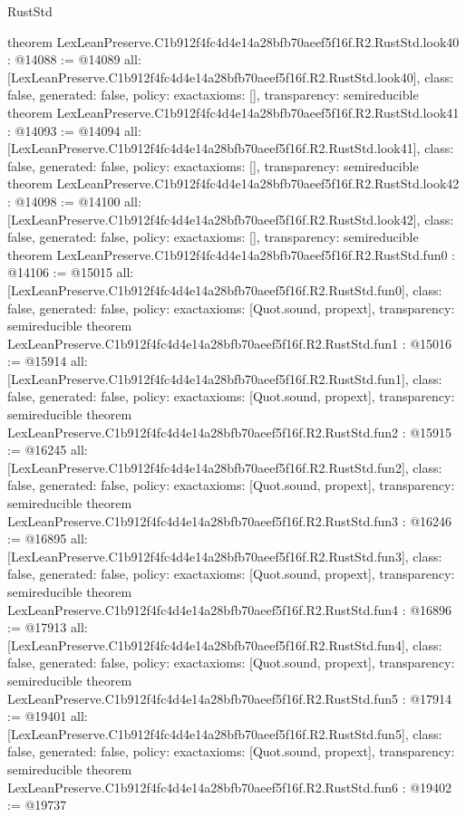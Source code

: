\begin{lexlean}{RustStd}
\begin{coremodule}
{}
theorem LexLeanPreserve.C1b912f4fc4d4e14a28bfb70aeef5f16f.R2.RustStd.look40 : @14088 := @14089 {
  all: [LexLeanPreserve.C1b912f4fc4d4e14a28bfb70aeef5f16f.R2.RustStd.look40],
  class: false,
  generated: false,
  policy: exact{axioms: []},
  transparency: semireducible
}
theorem LexLeanPreserve.C1b912f4fc4d4e14a28bfb70aeef5f16f.R2.RustStd.look41 : @14093 := @14094 {
  all: [LexLeanPreserve.C1b912f4fc4d4e14a28bfb70aeef5f16f.R2.RustStd.look41],
  class: false,
  generated: false,
  policy: exact{axioms: []},
  transparency: semireducible
}
theorem LexLeanPreserve.C1b912f4fc4d4e14a28bfb70aeef5f16f.R2.RustStd.look42 : @14098 := @14100 {
  all: [LexLeanPreserve.C1b912f4fc4d4e14a28bfb70aeef5f16f.R2.RustStd.look42],
  class: false,
  generated: false,
  policy: exact{axioms: []},
  transparency: semireducible
}
theorem LexLeanPreserve.C1b912f4fc4d4e14a28bfb70aeef5f16f.R2.RustStd.fun0 : @14106 := @15015 {
  all: [LexLeanPreserve.C1b912f4fc4d4e14a28bfb70aeef5f16f.R2.RustStd.fun0],
  class: false,
  generated: false,
  policy: exact{axioms: [Quot.sound, propext]},
  transparency: semireducible
}
theorem LexLeanPreserve.C1b912f4fc4d4e14a28bfb70aeef5f16f.R2.RustStd.fun1 : @15016 := @15914 {
  all: [LexLeanPreserve.C1b912f4fc4d4e14a28bfb70aeef5f16f.R2.RustStd.fun1],
  class: false,
  generated: false,
  policy: exact{axioms: [Quot.sound, propext]},
  transparency: semireducible
}
theorem LexLeanPreserve.C1b912f4fc4d4e14a28bfb70aeef5f16f.R2.RustStd.fun2 : @15915 := @16245 {
  all: [LexLeanPreserve.C1b912f4fc4d4e14a28bfb70aeef5f16f.R2.RustStd.fun2],
  class: false,
  generated: false,
  policy: exact{axioms: [Quot.sound, propext]},
  transparency: semireducible
}
theorem LexLeanPreserve.C1b912f4fc4d4e14a28bfb70aeef5f16f.R2.RustStd.fun3 : @16246 := @16895 {
  all: [LexLeanPreserve.C1b912f4fc4d4e14a28bfb70aeef5f16f.R2.RustStd.fun3],
  class: false,
  generated: false,
  policy: exact{axioms: [Quot.sound, propext]},
  transparency: semireducible
}
theorem LexLeanPreserve.C1b912f4fc4d4e14a28bfb70aeef5f16f.R2.RustStd.fun4 : @16896 := @17913 {
  all: [LexLeanPreserve.C1b912f4fc4d4e14a28bfb70aeef5f16f.R2.RustStd.fun4],
  class: false,
  generated: false,
  policy: exact{axioms: [Quot.sound, propext]},
  transparency: semireducible
}
theorem LexLeanPreserve.C1b912f4fc4d4e14a28bfb70aeef5f16f.R2.RustStd.fun5 : @17914 := @19401 {
  all: [LexLeanPreserve.C1b912f4fc4d4e14a28bfb70aeef5f16f.R2.RustStd.fun5],
  class: false,
  generated: false,
  policy: exact{axioms: [Quot.sound, propext]},
  transparency: semireducible
}
theorem LexLeanPreserve.C1b912f4fc4d4e14a28bfb70aeef5f16f.R2.RustStd.fun6 : @19402 := @19737 {
}
\end{coremodule}
\end{lexlean}
